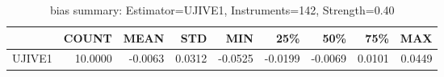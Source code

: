 \begin{table}[ht]
\centering
\caption{bias summary: Estimator=UJIVE1, Instruments=142, Strength=0.40}
\begin{tabular}{lrrrrrrrr}
\toprule
 & COUNT & MEAN & STD & MIN & 25\% & 50\% & 75\% & MAX \\
\midrule
UJIVE1 & 10.0000 & -0.0063 & 0.0312 & -0.0525 & -0.0199 & -0.0069 & 0.0101 & 0.0449 \\
\bottomrule
\end{tabular}
\end{table}
